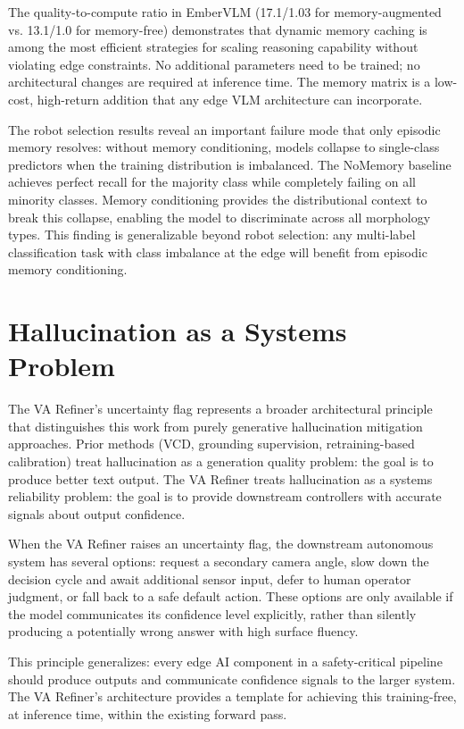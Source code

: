 The quality-to-compute ratio in EmberVLM (17.1/1.03 for memory-augmented vs. 13.1/1.0 for memory-free) demonstrates that dynamic memory caching is among the most efficient strategies for scaling reasoning capability without violating edge constraints. No additional parameters need to be trained; no architectural changes are required at inference time. The memory matrix is a low-cost, high-return addition that any edge VLM architecture can incorporate.

The robot selection results reveal an important failure mode that only episodic memory resolves: without memory conditioning, models collapse to single-class predictors when the training distribution is imbalanced. The NoMemory baseline achieves perfect recall for the majority class while completely failing on all minority classes. Memory conditioning provides the distributional context to break this collapse, enabling the model to discriminate across all morphology types. This finding is generalizable beyond robot selection: any multi-label classification task with class imbalance at the edge will benefit from episodic memory conditioning.

\section{Hallucination as a Systems Problem}
\label{sec:disc_hallucination_systems}

The VA Refiner's uncertainty flag represents a broader architectural principle that distinguishes this work from purely generative hallucination mitigation approaches. Prior methods (VCD, grounding supervision, retraining-based calibration) treat hallucination as a generation quality problem: the goal is to produce better text output. The VA Refiner treats hallucination as a systems reliability problem: the goal is to provide downstream controllers with accurate signals about output confidence.

When the VA Refiner raises an uncertainty flag, the downstream autonomous system has several options: request a secondary camera angle, slow down the decision cycle and await additional sensor input, defer to human operator judgment, or fall back to a safe default action. These options are only available if the model communicates its confidence level explicitly, rather than silently producing a potentially wrong answer with high surface fluency.

This principle generalizes: every edge AI component in a safety-critical pipeline should produce outputs and communicate confidence signals to the larger system. The VA Refiner's architecture provides a template for achieving this training-free, at inference time, within the existing forward pass.

